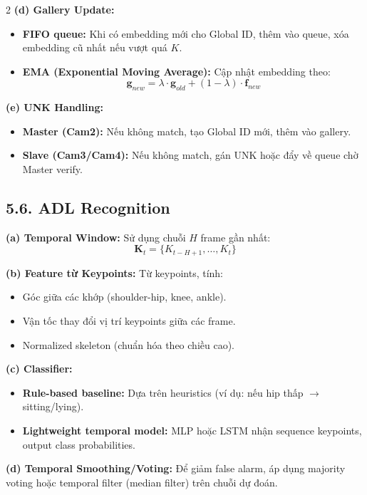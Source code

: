 \documentclass[a4paper,13pt]{article}
\begin{document}
\begin{multicols}{2}
\textbf{(d) Gallery Update:}
\begin{itemize}
    \item \textbf{FIFO queue:} Khi có embedding mới cho Global ID, thêm vào queue, xóa embedding cũ nhất nếu vượt quá $K$.
    \item \textbf{EMA (Exponential Moving Average):} Cập nhật embedding theo:
    \begin{equation}
    \mathbf{g}_{new} = \lambda \cdot \mathbf{g}_{old} + (1-\lambda) \cdot \mathbf{f}_{new}
    \end{equation}
\end{itemize}

\textbf{(e) UNK Handling:}
\begin{itemize}
    \item \textbf{Master (Cam2):} Nếu không match, tạo Global ID mới, thêm vào gallery.
    \item \textbf{Slave (Cam3/Cam4):} Nếu không match, gán UNK hoặc đẩy về queue chờ Master verify.
\end{itemize}

\subsection*{5.6. ADL Recognition}

\textbf{(a) Temporal Window:}
Sử dụng chuỗi $H$ frame gần nhất:
\begin{equation}
\mathbf{K}_t = \{K_{t-H+1}, \ldots, K_t\}
\end{equation}

\textbf{(b) Feature từ Keypoints:}
Từ keypoints, tính:
\begin{itemize}
    \item Góc giữa các khớp (shoulder-hip, knee, ankle).
    \item Vận tốc thay đổi vị trí keypoints giữa các frame.
    \item Normalized skeleton (chuẩn hóa theo chiều cao).
\end{itemize}

\textbf{(c) Classifier:}
\begin{itemize}
    \item \textbf{Rule-based baseline:} Dựa trên heuristics (ví dụ: nếu hip thấp $\to$ sitting/lying).
    \item \textbf{Lightweight temporal model:} MLP hoặc LSTM nhận sequence keypoints, output class probabilities.
\end{itemize}

\textbf{(d) Temporal Smoothing/Voting:}
Để giảm false alarm, áp dụng majority voting hoặc temporal filter (median filter) trên chuỗi dự đoán.


\end{multicols}
\end{document}
